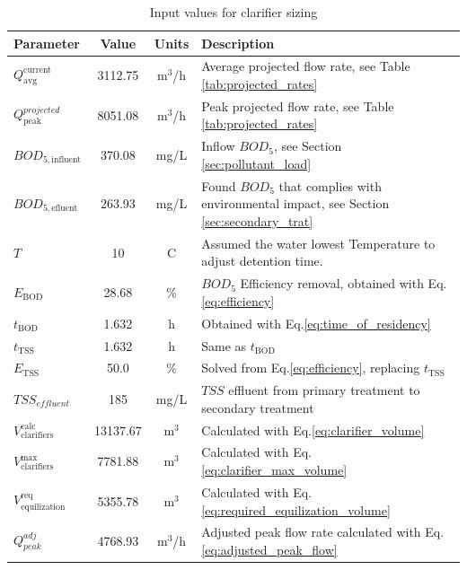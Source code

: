 \documentclass[11pt]{article}
\begin{document}
\begin{table}[h]
\centering
\caption{Input values for clarifier sizing}
\label{tab:clarifier_inputs}
\begin{tabularx}{\textwidth}{|l|c|c|X|}
\hline
\textbf{Parameter} & \textbf{Value} & \textbf{Units} & \textbf{Description}\\
\hline
$Q_{\text{avg}}^{\text{current}}$ & 
3112.75
& m$^3$/h &  Average projected flow rate, see Table \ref{tab:projected_rates}\\
$Q_{\text{peak}}^{projected}$ & 
8051.08
& m$^3$/h & Peak projected flow rate, see Table \ref{tab:projected_rates}\\
$BOD_{5,\text{influent}}$ & 
370.08
& mg/L & Inflow $BOD_5$, see Section \ref{sec:pollutant_load}\\
$BOD_{5,\text{efluent}}$ & 
263.93
& mg/L & Found $BOD_5$ that complies with environmental impact, see Section \ref{sec:secondary_trat}\\
$T$ & 
10
& C & Assumed the water lowest Temperature to adjust detention time.\\
$E_{\text{BOD}}$ & 
28.68
& \% & $BOD_5$ Efficiency removal, obtained with Eq.\eqref{eq:efficiency} \\
$t_{\text{BOD}}$ & 
1.632
& h & Obtained with Eq.\eqref{eq:time_of_residency}\\
$t_{\text{TSS}}$ & 
1.632
& h & Same as $t_{\text{BOD}}$\\
$E_{\text{TSS}}$ & 
50.0
& \% & Solved from Eq.\eqref{eq:efficiency}, replacing $t_{\text{TSS}}$\\[0.5em]
$TSS_{effluent}$ & 185 & mg/L & $TSS$ effluent from primary treatment to secondary treatment\\[0.5em]
$V_{\text{clarifiers}}^{\text{calc}}$ & 
13137.67
& m$^3$ & Calculated with Eq.\eqref{eq:clarifier_volume}\\[0.5em]
$V_{\text{clarifiers}}^{\text{max}}$ &
7781.88
& m$^3$ & Calculated with Eq.\eqref{eq:clarifier_max_volume}\\[0.5em]
$V_{\text{equilization}}^{\text{req}}$ &
5355.78
& m$^3$ & Calculated with Eq.\eqref{eq:required_equilization_volume}\\[0.5em]
$Q_{peak}^{adj}$ &
4768.93
& m$^3$/h & Adjusted peak flow rate calculated with Eq.\eqref{eq:adjusted_peak_flow}\\
\hline
\end{tabularx}
\end{table}
\end{document}
